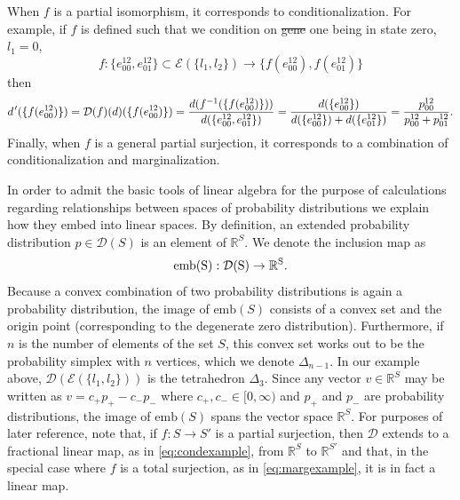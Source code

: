 \documentclass[10pt]{article}
\def\expr{\mathcal{E}}
\def\dist{\mathcal{D}}
\providecommand{\DIFaddtex}[1]{{\protect\color{blue}\uwave{#1}}} %
\providecommand{\DIFdeltex}[1]{{\protect\color{red}\sout{#1}}}                      %
\providecommand{\DIFaddbegin}{} %
\providecommand{\DIFaddend}{} %
\providecommand{\DIFdelbegin}{} %
\providecommand{\DIFdelend}{} %
\providecommand{\DIFadd}[1]{\texorpdfstring{\DIFaddtex{#1}}{#1}} %
\providecommand{\DIFdel}[1]{\texorpdfstring{\DIFdeltex{#1}}{}} %
\begin{document}
When $f$ is a partial isomorphism, it corresponds to conditionalization. For example, if $f$ is defined such that we condition on \DIFdelbegin \DIFdel{gene }\DIFdelend \DIFaddbegin \DIFadd{variable }\DIFaddend one being in state zero, $l_1 = 0$,
\begin{equation}
f \colon \{ e^{12}_{00} , e^{12}_{01} \} \subset \expr ( \{ l_1, l_2 \} ) \to \{ f(e^{12}_{00}) , f(e^{12}_{01}) \}
\end{equation}
then
\begin{equation}\label{eq:condexample}
d\hspace{.09em}'(\{ f(e^{12}_{00}) \} ) = \dist (f)(d)( \{ f(e^{12}_{00}) \}) = \frac{d( f^{-1}( \{ f(e^{12}_{00}) \}) )}{d(\{ e^{12}_{00},e^{12}_{01} \})} = \frac{d(\{ e^{12}_{00} \})}{d( \{ e^{12}_{00} \} ) + d( \{ e^{12}_{01} \} )} = \frac{p^{12}_{00}}{p^{12}_{00} + p^{12}_{01}}.
\end{equation}
Finally, when $f$ is a general partial surjection, it corresponds to a combination of conditionalization and marginalization.

In order to admit the basic tools of linear algebra for the purpose of calculations regarding relationships between spaces of probability distributions we explain how they embed into linear spaces. By definition, an extended probability distribution $p \in \dist(S)$ is an element of $\mathbb{R}^S$. We denote the inclusion map as
\begin{equation}\label{eq:emb}
\rm{emb}(S) : \dist(S) \to \mathbb{R}^S.
\end{equation}
Because a convex combination of two probability distributions is again a probability distribution, the image of $\mathrm{emb}(S)$ consists of a convex set and the origin point (corresponding to the degenerate zero distribution).  Furthermore, if $n$ is the number of elements of the set $S$, this convex set works out to be the probability simplex with $n$ vertices, which we denote $\Delta_{n-1}$.  In our example above, $\mathcal{D}(\mathcal{E}(\{l_1,l_2\}))$ is the tetrahedron $\Delta_3$. Since any vector $v \in \mathbb{R}^S$ may be written as $v = c_{+} p_{+} - c_{-} p_{-}$ where $c_{+}, c_{-} \in [0,\infty)$ and $p_{+}$ and $p_{-}$ are probability distributions, the image of $\mathrm{emb}(S)$ spans the vector space $\mathbb{R}^S$.  For purposes of later reference, note that, if $f \colon S \to S'$ is a partial surjection, then $\mathcal{D}$ extends to a fractional linear map, as in \ref{eq:condexample}, from $\mathbb{R}^S$ to $\mathbb{R}^{S'}$ and that, in the special case where $f$ is a total surjection, as in \ref{eq:margexample}, it is in fact a linear map.
\end{document}
